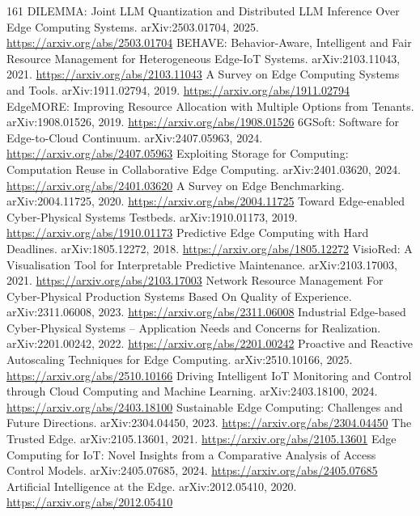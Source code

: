 \documentclass[11pt]{article}
\begin{document}
\begin{thebibliography}{161}
 DILEMMA: Joint LLM Quantization and Distributed LLM Inference Over Edge Computing Systems. arXiv:2503.01704, 2025. \url{https://arxiv.org/abs/2503.01704}
 BEHAVE: Behavior-Aware, Intelligent and Fair Resource Management for Heterogeneous Edge-IoT Systems. arXiv:2103.11043, 2021. \url{https://arxiv.org/abs/2103.11043}
 A Survey on Edge Computing Systems and Tools. arXiv:1911.02794, 2019. \url{https://arxiv.org/abs/1911.02794}
 EdgeMORE: Improving Resource Allocation with Multiple Options from Tenants. arXiv:1908.01526, 2019. \url{https://arxiv.org/abs/1908.01526}
 6GSoft: Software for Edge-to-Cloud Continuum. arXiv:2407.05963, 2024. \url{https://arxiv.org/abs/2407.05963}
 Exploiting Storage for Computing: Computation Reuse in Collaborative Edge Computing. arXiv:2401.03620, 2024. \url{https://arxiv.org/abs/2401.03620}
 A Survey on Edge Benchmarking. arXiv:2004.11725, 2020. \url{https://arxiv.org/abs/2004.11725}
 Toward Edge-enabled Cyber-Physical Systems Testbeds. arXiv:1910.01173, 2019. \url{https://arxiv.org/abs/1910.01173}
 Predictive Edge Computing with Hard Deadlines. arXiv:1805.12272, 2018. \url{https://arxiv.org/abs/1805.12272}
 VisioRed: A Visualisation Tool for Interpretable Predictive Maintenance. arXiv:2103.17003, 2021. \url{https://arxiv.org/abs/2103.17003}
 Network Resource Management For Cyber-Physical Production Systems Based On Quality of Experience. arXiv:2311.06008, 2023. \url{https://arxiv.org/abs/2311.06008}
 Industrial Edge-based Cyber-Physical Systems -- Application Needs and Concerns for Realization. arXiv:2201.00242, 2022. \url{https://arxiv.org/abs/2201.00242}
 Proactive and Reactive Autoscaling Techniques for Edge Computing. arXiv:2510.10166, 2025. \url{https://arxiv.org/abs/2510.10166}
 Driving Intelligent IoT Monitoring and Control through Cloud Computing and Machine Learning. arXiv:2403.18100, 2024. \url{https://arxiv.org/abs/2403.18100}
 Sustainable Edge Computing: Challenges and Future Directions. arXiv:2304.04450, 2023. \url{https://arxiv.org/abs/2304.04450}
 The Trusted Edge. arXiv:2105.13601, 2021. \url{https://arxiv.org/abs/2105.13601}
 Edge Computing for IoT: Novel Insights from a Comparative Analysis of Access Control Models. arXiv:2405.07685, 2024. \url{https://arxiv.org/abs/2405.07685}
 Artificial Intelligence at the Edge. arXiv:2012.05410, 2020. \url{https://arxiv.org/abs/2012.05410}

\end{thebibliography}
\end{document}
